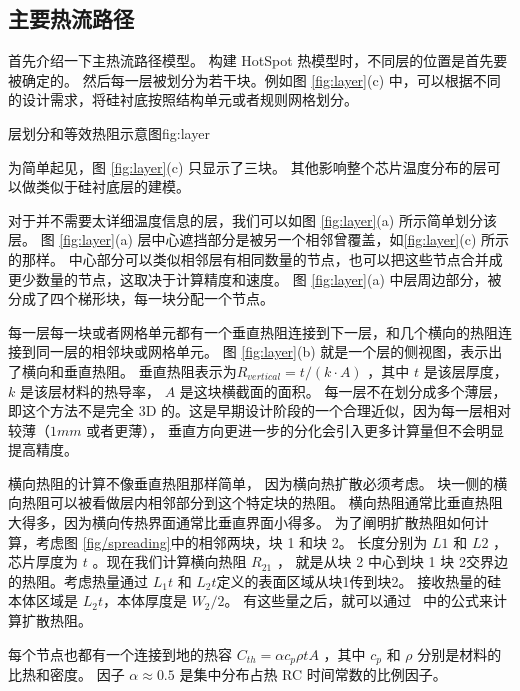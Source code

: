 \subsection{主要热流路径}\label{sec:primary}

首先介绍一下主热流路径模型。
构建 HotSpot 热模型时，不同层的位置是首先要被确定的。
然后每一层被划分为若干块。例如图 \ref{fig:layer}(c) 中，可以根据不同的设计需求，将硅衬底按照结构单元或者规则网格划分。
 \begin{pics}{层划分和等效热阻示意图}{fig:layer}
 \end{pics}
为简单起见，图 \ref{fig:layer}(c) 只显示了三块。
其他影响整个芯片温度分布的层可以做类似于硅衬底层的建模。

对于并不需要太详细温度信息的层，我们可以如图 \ref{fig:layer}(a) 所示简单划分该层。
图 \ref{fig:layer}(a) 层中心遮挡部分是被另一个相邻曾覆盖，如\ref{fig:layer}(c) 所示的那样。
中心部分可以类似相邻层有相同数量的节点，也可以把这些节点合并成更少数量的节点，这取决于计算精度和速度。
图 \ref{fig:layer}(a) 中层周边部分，被分成了四个梯形块，每一块分配一个节点。

每一层每一块或者网格单元都有一个垂直热阻连接到下一层，和几个横向的热阻连接到同一层的相邻块或网格单元。
图 \ref{fig:layer}(b) 就是一个层的侧视图，表示出了横向和垂直热阻。
垂直热阻表示为$R_{vertical} = t/(k \cdot A)$ ，其中 $t$ 是该层厚度， $k$ 是该层材料的热导率， $A$ 是这块横截面的面积。
每一层不在划分成多个薄层，即这个方法不是完全 3D 的。这是早期设计阶段的一个合理近似，因为每一层相对较薄（$1 mm$ 或者更薄），
垂直方向更进一步的分化会引入更多计算量但不会明显提高精度。

横向热阻的计算不像垂直热阻那样简单，
因为横向热扩散必须考虑。
块一侧的横向热阻可以被看做层内相邻部分到这个特定块的热阻。
横向热阻通常比垂直热阻大得多，因为横向传热界面通常比垂直界面小得多。
为了阐明扩散热阻如何计算，考虑图 \ref{fig/spreading}中的相邻两块，块 1 和块 2。
长度分别为 $L1$ 和 $L2$ ，芯片厚度为 $t$ 。现在我们计算横向热阻 $R_{21}$ ， 
就是从块 2 中心到块 1 块 2交界边的热阻。考虑热量通过 $L_1t$ 和 $L_2t$定义的表面区域从块1传到块2。
接收热量的硅本体区域是 $L_2t$，本体厚度是 $W_2/2$。
有这些量之后，就可以通过~\cite{song1995constriction} 中的公式来计算扩散热阻。

每个节点也都有一个连接到地的热容 $C_{th} = \alpha c_p \rho t A$ ，其中 $c_p$ 和 $\rho$ 分别是材料的比热和密度。
因子  $\alpha \approx 0.5$ 是集中分布占热 RC 时间常数的比例因子。

